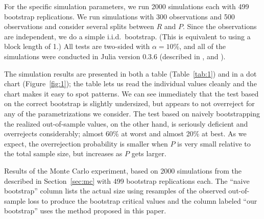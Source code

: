 \documentclass[12pt,fleqn]{article}
\begin{document}
For the specific simulation parameters, we run 2000 simulations each
with 499 bootstrap replications. We run simulations with 300
observations and 500 observations and consider several splits between
$R$ and $P$. Since the observations are independent, we do a simple
i.i.d.\ bootstrap. (This is equivalent to using a block length of 1.)
All tests are two-sided with $\alpha = 10\%$, and all of
the simulations were conducted in Julia version 0.3.6 (described in
\citealp{BKSE12}, and \citealp{BEKS14}).

The simulation results are presented in both a table
(Table~\ref{tab:1}) and in a dot chart (Figure~\ref{fig:1}); the table
lets us read the individual values cleanly and the chart makes it easy
to spot patterns. We can see immediately that the test based on the
correct bootstrap is slightly undersized, but appears to not
overreject for any of the parametrizations we consider. The test based
on naively bootstrapping the realized out-of-sample values, on the
other hand, is seriously deficient and overrejects considerably;
almost 60\% at worst and almost 20\% at best. As we expect, the
overrejection probability is smaller when $P$ is very small relative
to the total sample size, but increases as $P$ gets larger.

\begin{table}[t]
  \centering
  
  \caption{Results of the Monte Carlo experiment, based on 2000
    simulations from the \dgp described in Section~\ref{sec:mc} with 499
    bootstrap replications each. The ``naive bootstrap'' column lists the
    actual size
    using resamples of the observed out-of-sample loss to produce the
    bootstrap critical values and the column labeled ``our bootstrap'' uses
    the method proposed in this paper.}
  \label{tab:1}
\end{table}
\end{document}
